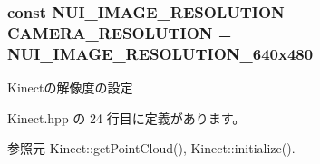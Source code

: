 \subsubsection[{C\-A\-M\-E\-R\-A\-\_\-\-R\-E\-S\-O\-L\-U\-T\-I\-O\-N}]{\setlength{\rightskip}{0pt plus 5cm}const N\-U\-I\-\_\-\-I\-M\-A\-G\-E\-\_\-\-R\-E\-S\-O\-L\-U\-T\-I\-O\-N C\-A\-M\-E\-R\-A\-\_\-\-R\-E\-S\-O\-L\-U\-T\-I\-O\-N = N\-U\-I\-\_\-\-I\-M\-A\-G\-E\-\_\-\-R\-E\-S\-O\-L\-U\-T\-I\-O\-N\-\_\-640x480}\label{_kinect_8hpp_ac0e005483bfce51f732e38048c0b1898}
Kinectの解像度の設定 

 Kinect.\-hpp の 24 行目に定義があります。



参照元 Kinect\-::get\-Point\-Cloud(), Kinect\-::initialize().

